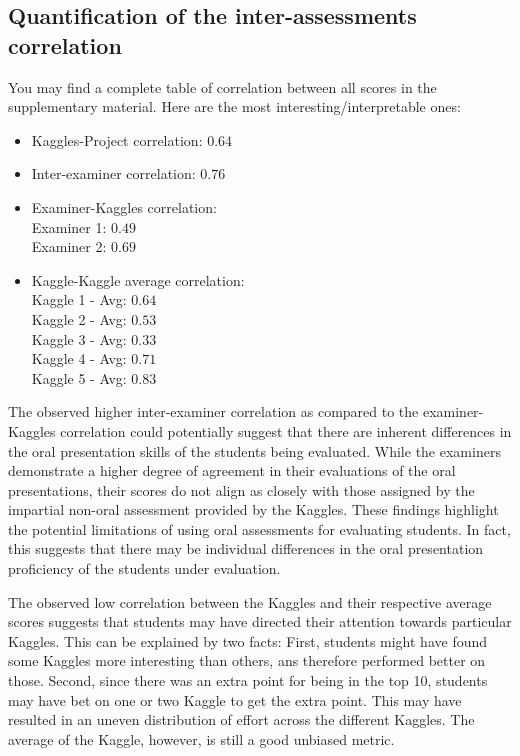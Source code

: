 \documentclass[a4paper]{article}
\begin{document}
	\subsection{Quantification of the inter-assessments correlation}
	You may find a complete table of correlation between all scores in the supplementary material.
	Here are the most interesting/interpretable ones:
	\begin{itemize}
		\item Kaggles-Project correlation: $0.64$
		\item Inter-examiner correlation: $0.76$
		\item Examiner-Kaggles correlation:\\
		Examiner 1: $0.49$\\
		Examiner 2: $0.69$
		\item Kaggle-Kaggle average correlation:\\
		Kaggle 1 - Avg: $0.64$\\
		Kaggle 2 - Avg: $0.53$\\
		Kaggle 3 - Avg: $0.33$\\
		Kaggle 4 - Avg: $0.71$\\
		Kaggle 5 - Avg: $0.83$
	\end{itemize}
	The observed higher inter-examiner correlation as compared to the examiner-Kaggles correlation could potentially suggest that there are inherent differences in the oral presentation skills of the students being evaluated.
	While the examiners demonstrate a higher degree of agreement in their evaluations of the oral presentations, their scores do not align as closely with those assigned by the impartial non-oral assessment provided by the Kaggles.
	These findings highlight the potential limitations of using oral assessments for evaluating students.
	In fact, this suggests that there may be individual differences in the oral presentation proficiency of the students under evaluation.
	
	The observed low correlation between the Kaggles and their respective average scores suggests that students may have directed their attention towards particular Kaggles.
	This can be explained by two facts:
	First, students might have found some Kaggles more interesting than others, ans therefore performed better on those.
	Second, since there was an extra point for being in the top 10, students may have bet on one or two Kaggle to get the extra point.
	This may have resulted in an uneven distribution of effort across the different Kaggles.
	The average of the Kaggle, however, is still a good unbiased metric.
	
\end{document}
